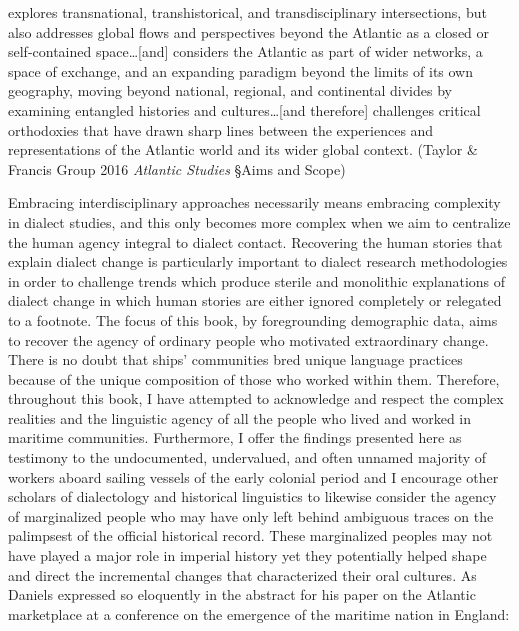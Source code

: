 \begin{styleStandard}
explores transnational, transhistorical, and transdisciplinary intersections, but also addresses global flows and perspectives beyond the Atlantic as a closed or self-contained space…[and] considers the Atlantic as part of wider networks, a space of exchange, and an expanding paradigm beyond the limits of its own geography, moving beyond national, regional, and continental divides by examining entangled histories and cultures…[and therefore] challenges critical orthodoxies that have drawn sharp lines between the experiences and representations of the Atlantic world and its wider global context. (Taylor \& Francis Group 2016 \textit{Atlantic Studies} §Aims and Scope)
\end{styleStandard}

\begin{styleStandard}
Embracing interdisciplinary approaches necessarily means embracing complexity in dialect studies, and this only becomes more complex when we aim to centralize the human agency integral to dialect contact. Recovering the human stories that explain dialect change is particularly important to dialect research methodologies in order to challenge trends which produce sterile and monolithic explanations of dialect change in which human stories are either ignored completely or relegated to a footnote. The focus of this book, by foregrounding demographic data, aims to recover the agency of ordinary people who motivated extraordinary change. There is no doubt that ships’ communities bred unique language practices because of the unique composition of those who worked within them. Therefore, throughout this book, I have attempted to acknowledge and respect the complex realities and the linguistic agency of all the people who lived and worked in maritime communities. Furthermore, I offer the findings presented here as testimony to the undocumented, undervalued, and often unnamed majority of workers aboard sailing vessels of the early colonial period and I encourage other scholars of dialectology and historical linguistics to likewise consider the agency of marginalized people who may have only left behind ambiguous traces on the palimpsest of the official historical record. These marginalized peoples may not have played a major role in imperial history yet they potentially helped shape and direct the incremental changes that characterized their oral cultures. As Daniels expressed so eloquently in the abstract for his paper on the Atlantic marketplace at a conference on the emergence of the maritime nation in England:
\end{styleStandard}

